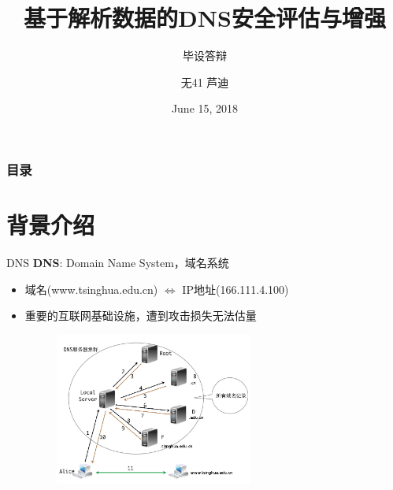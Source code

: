 \documentclass{beamer}
\title[毕设答辩] %
{基于解析数据的DNS安全评估与增强}
\subtitle{毕设答辩}
\author[芦迪] %
{无41 芦迪}
\institute[THU, EE] %
{
  \normalsize{指导老师：李星} \\
  \
  
  Department of Electronic Engineering,\\
  Tsinghua University
  
}
\date[2018.6.15] %
{June 15, 2018}
\begin{document}
\frame{\titlepage}


\begin{frame}
\frametitle{目录}
\tableofcontents
\end{frame}
\section{背景介绍}
\begin{frame}{DNS}
  \textbf{DNS}: Domain Name System，域名系统
  \begin{itemize}
    \item 域名(www.tsinghua.edu.cn) \(\Longleftrightarrow\) IP地址(166.111.4.100)
    \item 重要的互联网基础设施，遭到攻击损失无法估量
    \begin{figure}
      \includegraphics[height=5cm]{figures/dns/name_resolution.jpg}
      \end{figure}
    
   
  \end{itemize}
  
\end{frame}
\end{document}

